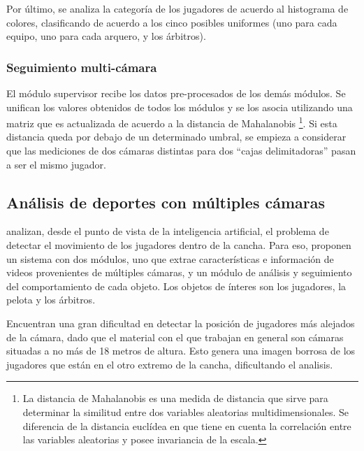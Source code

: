 Por último, se analiza la categoría de los
jugadores de acuerdo al histograma de colores, clasificando de acuerdo a los
cinco posibles uniformes (uno para cada equipo, uno para cada arquero, y los
árbitros).

\subsubsection{Seguimiento multi-cámara}

El módulo supervisor recibe los datos pre-procesados de los demás módulos.
Se unifican los valores obtenidos
de todos los módulos y se los asocia utilizando una matriz que es actualizada
de acuerdo a la distancia de Mahalanobis \footnote {La distancia de Mahalanobis
es una medida de distancia que sirve para determinar la similitud entre dos
variables aleatorias multidimensionales. Se diferencia de la distancia
euclídea en que tiene en cuenta la correlación entre
las variables aleatorias y posee invariancia de la escala.}. Si esta distancia queda por debajo de
un determinado umbral, se empieza a considerar que las mediciones de dos
cámaras distintas para dos ``cajas delimitadoras'' pasan a ser el mismo
jugador.

\subsection{Análisis de deportes con múltiples cámaras}
\label{sec:var-camaras}


\citeauthor*{beetz-05} analizan, desde el punto de vista de la inteligencia
artificial, el problema de detectar el movimiento de los jugadores dentro
de la cancha. Para eso, proponen un sistema con dos módulos, uno que extrae
características e información de videos provenientes de múltiples cámaras, y
un módulo de análisis y seguimiento del comportamiento de cada objeto.
Los objetos de ínteres son los jugadores, la pelota y los árbitros.

Encuentran una gran dificultad en detectar la posición de jugadores más alejados de la cámara,
dado que el material con el que trabajan en general son cámaras situadas a no más de 18
metros de altura. Esto genera una imagen borrosa de los jugadores que están
en el otro extremo de la cancha, dificultando el analisis.

